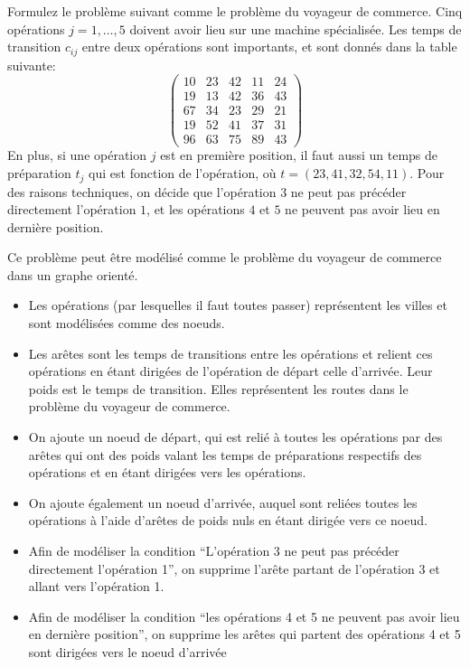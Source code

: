 Formulez le problème suivant comme le problème du voyageur de commerce. Cinq opérations $j=1,…,5$ doivent avoir lieu sur une machine spécialisée. Les temps de transition $c_{ij}$ entre deux opérations sont importants, et sont donnés dans la table suivante:
\begin{equation}
  \left( \begin{matrix}
      10 & 23 & 42 & 11 & 24 \\
      19 & 13 & 42 & 36 & 43 \\
      67 & 34 & 23 & 29 & 21 \\
      19 & 52 & 41 & 37 & 31 \\
      96 & 63 & 75 & 89 & 43
  \end{matrix}  \right)
\end{equation}
En plus, si une opération $j$ est en première position, il faut aussi un temps de préparation $t_j$ qui est fonction de l'opération, où $t=(23,41,32,54,11)$. Pour des raisons techniques, on décide que l'opération $3$ ne peut pas précéder directement l'opération $1$, et les opérations $4$ et $5$ ne peuvent pas avoir lieu en dernière position.

\begin{solution}
Ce problème peut être modélisé comme le problème du voyageur de commerce dans un graphe orienté.
\begin{itemize}
\item Les opérations (par lesquelles il faut toutes passer) représentent les villes et sont modélisées comme des noeuds. 
\item Les arêtes sont les temps de transitions entre les opérations et relient ces opérations en étant dirigées de l'opération de départ  celle d'arrivée. Leur poids est le temps de transition. Elles représentent les routes dans le problème du voyageur de commerce.
\item On ajoute un noeud de départ, qui est relié à toutes les opérations par des arêtes qui ont des poids valant les temps de préparations respectifs des opérations et en étant dirigées vers les opérations. 
\item On ajoute également un noeud d'arrivée, auquel sont reliées toutes les opérations à l'aide d'arêtes de poids nuls en étant dirigée vers ce noeud.
\item Afin de modéliser la condition ``L'opération 3 ne peut pas précéder directement l'opération 1'', on supprime l'arête partant de l'opération 3 et allant vers l'opération 1.
\item Afin de modéliser la condition ``les opérations 4 et 5 ne peuvent pas avoir lieu en dernière position'', on supprime les arêtes qui partent des opérations 4 et 5 sont dirigées vers le noeud d'arrivée
\end{itemize}
\end{solution}

